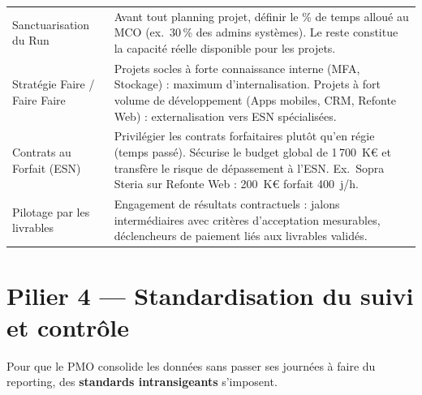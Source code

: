 \documentclass[11pt,a4paper,oneside]{report}
\begin{document}
\vspace{4pt}
\begin{center}
\renewcommand{\arraystretch}{1.5}
\begin{tabularx}{\textwidth}{L{4cm} L{10cm}}
\toprule
{}
 &  \\
\midrule
Sanctuarisation du Run & Avant tout planning projet, définir le \% de temps alloué au MCO (ex.\ 30\,\% des admins systèmes). Le reste constitue la capacité réelle disponible pour les projets. \\
Stratégie Faire / Faire Faire & Projets socles à forte connaissance interne (MFA, Stockage) : maximum d'internalisation. Projets à fort volume de développement (Apps mobiles, CRM, Refonte Web) : externalisation vers ESN spécialisées. \\
Contrats au Forfait (ESN) & Privilégier les contrats forfaitaires plutôt qu'en régie (temps passé). Sécurise le budget global de 1\,700~K€ et transfère le risque de dépassement à l'ESN. Ex.\ Sopra Steria sur Refonte Web : 200~K€ forfait 400~j/h. \\
Pilotage par les livrables & Engagement de résultats contractuels : jalons intermédiaires avec critères d'acceptation mesurables, déclencheurs de paiement liés aux livrables validés. \\
\bottomrule
\end{tabularx}
\end{center}

\section{Pilier 4 --- Standardisation du suivi et contrôle}

Pour que le PMO consolide les données sans passer ses journées à faire du reporting, des \textbf{standards intransigeants} s'imposent.
\end{document}
